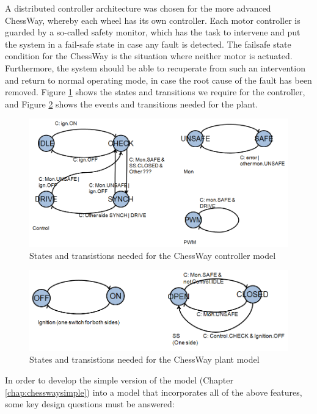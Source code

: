 A distributed controller architecture was chosen for the more advanced
ChessWay, whereby each wheel has its own controller. Each motor
controller is guarded by a so-called safety monitor, which has the
task to intervene and put the system in a fail-safe state in case any
fault is detected. The failsafe state condition for the ChessWay is
the situation where neither motor is actuated. Furthermore, the system
should be able to recuperate from such an intervention and return to
normal operating mode, in case the root cause of the fault has been
removed.  Figure \ref{fig:controllerstates} shows the states and
transitions we require for the controller, and Figure
\ref{fig:plantstates} shows the events and transitions needed for the
plant.
\begin{figure}[!ht ]
\centering
\includegraphics[width=1\textwidth]{chessWaySL/StatesForController.png}
\caption{States and transistions needed for the ChessWay controller model
\label{fig:controllerstates}}
\end{figure}

\begin{figure}[!ht ]
\centering
\includegraphics[width=1\textwidth]{chessWaySL/StatesForPlant.png}
\caption{States and transistions needed for the ChessWay plant model
\label{fig:plantstates}}
\end{figure}

In order to develop the simple version of the model (Chapter
\ref{chap:chesswaysimple}) into a model that incorporates all of the
above features, some key design questions must be answered:


